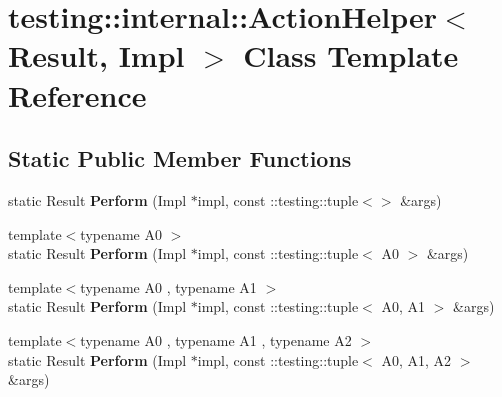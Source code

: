 \hypertarget{classtesting_1_1internal_1_1_action_helper}{}\section{testing\+:\+:internal\+:\+:Action\+Helper$<$ Result, Impl $>$ Class Template Reference}
\label{classtesting_1_1internal_1_1_action_helper}
\subsection*{Static Public Member Functions}
\begin{DoxyCompactItemize}
\item 
\mbox{\label{classtesting_1_1internal_1_1_action_helper_a25176836b0a381d883d61c3a2dc60662}} 
static Result {\bfseries Perform} (Impl $\ast$impl, const \+::testing\+::tuple$<$$>$ \&args)
\item 
\mbox{\label{classtesting_1_1internal_1_1_action_helper_a08d2e199b0a3a1f9e05982cae07db3ec}} 
{\footnotesize template$<$typename A0 $>$ }\\static Result {\bfseries Perform} (Impl $\ast$impl, const \+::testing\+::tuple$<$ A0 $>$ \&args)
\item 
\mbox{\label{classtesting_1_1internal_1_1_action_helper_a96d8d8399ff3322e77ba1de51c166f4e}} 
{\footnotesize template$<$typename A0 , typename A1 $>$ }\\static Result {\bfseries Perform} (Impl $\ast$impl, const \+::testing\+::tuple$<$ A0, A1 $>$ \&args)
\item 
\mbox{\label{classtesting_1_1internal_1_1_action_helper_ad450478d185cbcac0e1383f7517f5c36}} 
{\footnotesize template$<$typename A0 , typename A1 , typename A2 $>$ }\\static Result {\bfseries Perform} (Impl $\ast$impl, const \+::testing\+::tuple$<$ A0, A1, A2 $>$ \&args)
\item 
\mbox{\label{classtesting_1_1internal_1_1_action_helper_a2ceda08aeb7b9fd1ad6ccb0821a3ea39}} 
$$
\end{DoxyCompactItemize}
